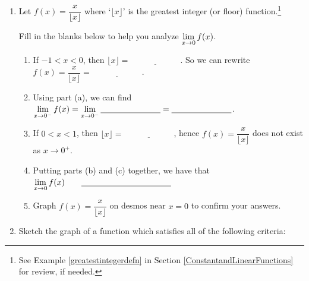 \begin{enumerate}
\setcounter{enumi}{\value{HW}}

\item  Let $f(x) = \dfrac{x}{\lfloor x \rfloor}$  where `$\lfloor x \rfloor$'  is the greatest integer (or floor) function.\footnote{See Example \ref{greatestintegerdefn} in Section \ref{ConstantandLinearFunctions} for review, if needed.} 

\smallskip

Fill in the blanks below to help you analyze $\displaystyle{ \lim_{x \rightarrow 0} f(x)}$.

\smallskip

\begin{enumerate}

\item  If $-1 < x < 0$, then $\lfloor x \rfloor = \underline{\hspace{1in}}$. So we can rewrite $f(x) = \dfrac{x}{\lfloor x \rfloor} =  \underline{\hspace{1in}}$.

\item  Using part (a), we can find  $\displaystyle{ \lim_{x \rightarrow 0^{-}} f(x) =  \lim_{x \rightarrow 0^{-}}  \underline{\hspace{1in}} =  \underline{\hspace{1in}} }$.

\item  If $0 < x < 1$, then $\lfloor x \rfloor = \underline{\hspace{1in}}$, hence $f(x) = \dfrac{x}{\lfloor x \rfloor}$ does not exist as $x \rightarrow 0^{+}$.

\item  Putting parts (b) and (c) together, we have that   $\displaystyle{ \lim_{x \rightarrow 0} f(x)  \qquad \underline{\hspace{1.5in}}}$

\item  Graph $f(x) = \dfrac{x}{\lfloor x \rfloor}$ on desmos near $x = 0$ to confirm your answers.

\end{enumerate}

\newpage

\item  Sketch the graph of a function which satisfies all of the following criteria:

\bigskip

\begin{multicols}{4}


\end{multicols}
\end{enumerate}
